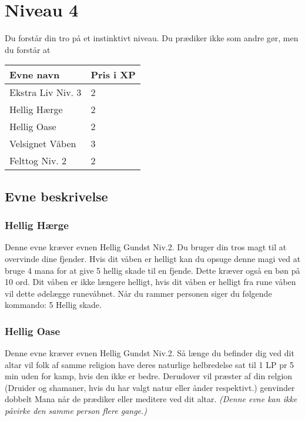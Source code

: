 \chapter{Niveau 4}
Du forstår din tro på et instinktivt niveau. Du prædiker ikke som andre gør, men du forstår at 


\begin{table}[H]
    \centering
    \begin{tabular}{|p{}|p{}|}
    \rowcolor{cerulean!80}\hline
        Evne navn & Pris i XP \\\hline
        Ekstra Liv Niv. 3& 2\\\hline
        Hellig Hærge & 2 \\\hline
        Hellig Oase & 2 \\\hline
        Velsignet Våben & 3 \\\hline
        Felttog Niv. 2 & 2\\\hline
    \end{tabular}
\end{table}
\section{Evne beskrivelse}



\subsection{Hellig Hærge}
Denne evne kræver evnen Hellig Gundst Niv.2. Du bruger din tros magt til at overvinde dine fjender. Hvis dit våben er helligt kan du opsuge denne magi ved at bruge 4 mana for at give 5 hellig skade til en fjende. Dette kræver også en bøn på 10 ord. Dit våben er ikke længere helligt, hvis dit våben er helligt fra rune våben vil dette ødelægge runevåbnet. Når du rammer personen siger du følgende kommando: 5 Hellig skade.

\subsection{Hellig Oase}
Denne evne kræver evnen Hellig Gundst Niv.2. Så længe du befinder dig ved dit altar vil folk af samme religion have deres naturlige helbredelse sat til 1 LP pr 5 min uden for kamp, hvis den ikke er bedre. Derudover vil præster af din relgion (Druider og shamaner, hvis du har valgt natur eller ånder respektivt.) genvinder dobbelt Mana når de prædiker eller meditere ved dit altar. \textit{(Denne evne kan ikke påvirke den samme person flere gange.)}

